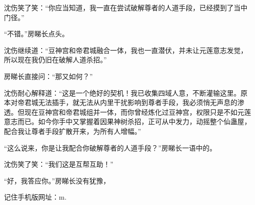 \begin{this_body}
沈伤笑了笑：“你应当知道，我一直在尝试破解尊者的人道手段，已经摸到了当中门径。”

“不错。”房睇长点头。

沈伤继续道：“豆神宫和帝君城融合一体，我也一直潜伏，并未让元莲意志发觉，所以现在我仍旧在破解人道杀招。”

房睇长直接问：“那又如何？”

沈伤耐心解释道：“这是一个绝好的契机！我已收集四域人意，不断灌输这里。原本对帝君城无法插手，就无法从内里干扰影响到尊者手段，我必须悄无声息的渗透。但现在豆神宫和帝君城组并一体，而你曾经炼化过豆神宫，权限只是不如元莲意志而已。如今你手中又掌握着因果神树杀招，正可从中发力，动摇整个仙蛊屋，配合我让尊者手段扩散开来，为所有人增幅。”

“这么说来，你是让我配合你破解尊者的人道手段？”房睇长一语中的。

沈伤笑了笑：“我们这是互帮互助！”

“好，我答应你。”房睇长没有犹豫，

记住手机版网址：m.

\end{this_body}

